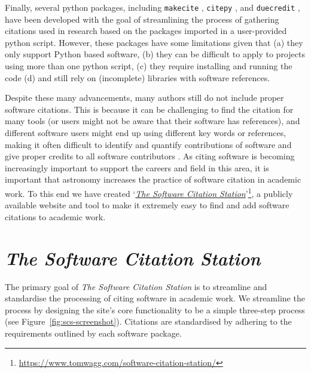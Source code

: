 \documentclass[twocolumn,linenumbers]{aastex631}
\newcommand{\site}{\textit{The Software Citation Station}\xspace}
\begin{document}
Finally, several python packages, including \texttt{makecite} \citep{adrian_price_whelan_2019_3533303}, {\texttt{citepy}} \citep{citepy_software}, and \texttt{duecredit} \citep{duecredit}, have been developed with the goal of streamlining the process of gathering citations used in research based on the packages imported in a user-provided python script. However, these packages have some limitations given that (a) they only support Python based software, (b) they can be difficult to apply to projects using more than one python script, (c) they require installing and running the code (d) and still rely on (incomplete) libraries with software references.

Despite these many advancements, many authors still do not include proper software citations. This is because it can be challenging to find the citation for many tools (or users might not be aware that their software has references), and different software users might end up using different key words or references, making it often difficult to identify and quantify contributions of software and give proper credits to all software contributors \citep[see][and references therein]{katz:2018software, Katz:2019, katz2020recognizing, vandeSandt:2019, Bouquin:2020-apjs,Bouquin:2023,  Druskat:2021, Druskat:2024}. 
As citing software is becoming increasingly important to support the careers and field in this area, it is important that astronomy increases the practice of software citation in academic work. To this end we have created `\href{https://www.tomwagg.com/software-citation-station/}{\site}'\footnote{\url{https://www.tomwagg.com/software-citation-station/}}, a publicly available website and tool to make it extremely easy to find and add software citations to academic work.






\section{\site}

The primary goal of \site is to streamline and standardise the processing of citing software in academic work. We streamline the process by designing the site's core functionality to be a simple three-step process (see Figure~\ref{fig:scs-screenshot}). Citations are standardised by adhering to the requirements outlined by each software package.
\end{document}
